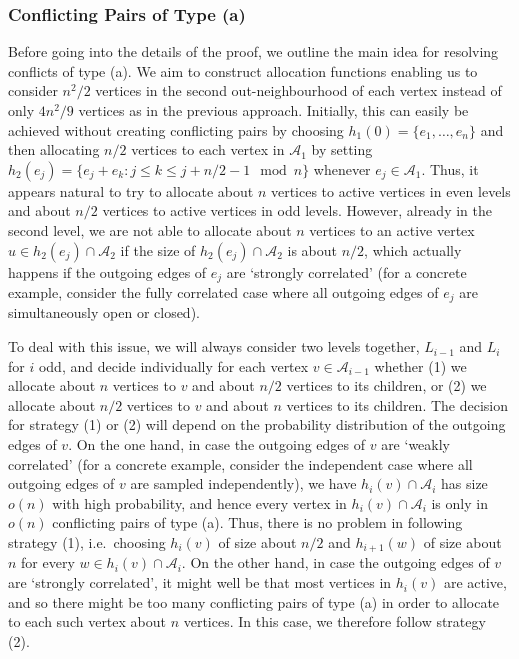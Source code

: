 \documentclass[11pt]{article}
\newcommand{\A}{\mathcal{A}}
\theoremstyle{remark}
\begin{document}
\subsubsection{Conflicting Pairs of Type (a)}

Before going into the details of the proof, we outline the main idea for resolving conflicts of type (a). We aim to construct allocation functions enabling us to consider $n^2/2$ vertices in the second out-neighbourhood of each vertex instead of only $4n^2/9$ vertices as in the previous approach. Initially, this can easily be achieved without creating conflicting pairs by choosing $h_1(0) = \{e_1,\ldots,e_n\}$ and then allocating $n/2$ vertices to each vertex in $\A_1$ by setting $h_2(e_j) = \{e_j + e_k : j \le k \le j+ n/2 -1 \mod n\}$ whenever $e_j \in \A_1$. Thus, it appears natural to try to allocate about $n$ vertices to active vertices in even levels and about $n/2$ vertices to active vertices in odd levels. However, already in the second level, we are not able to allocate about $n$ vertices to an active vertex $u \in h_2(e_j) \cap \A_2$ if the size of $h_2(e_j) \cap \A_2$ is about $n/2$, which actually happens if the outgoing edges of $e_j$ are `strongly correlated' (for a concrete example, consider the fully correlated case where all outgoing edges of $e_j$ are simultaneously open or closed). 

To deal with this issue, we will always consider two levels together, $L_{i-1}$ and $L_{i}$ for $i$ odd, and decide individually for each vertex $v \in \A_{i-1}$ whether (1) we allocate about $n$ vertices to $v$ and about $n/2$ vertices to its children, or (2) we allocate about $n/2$ vertices to $v$ and about $n$ vertices to its children. The decision for strategy (1) or (2) will depend on the probability distribution of the outgoing edges of $v$. On the one hand, in case the outgoing edges of $v$ are `weakly correlated' (for a concrete example, consider the independent case where all outgoing edges of $v$ are sampled independently), we have $h_{i}(v) \cap \A_{i}$ has size $o(n)$ with high probability, and hence every vertex in $h_{i}(v) \cap \A_{i}$ is only in $o(n)$ conflicting pairs of type (a). Thus, there is no problem in following strategy (1), i.e.\ choosing $h_{i}(v)$ of size about $n/2$ and $h_{i+1}(w)$ of size about $n$ for every $ w \in h_{i}(v) \cap \A_{i}$. On the other hand, in case the outgoing edges of $v$ are `strongly correlated', it might well be that most vertices in $h_{i}(v)$ are active, and so there might be too many conflicting pairs of type (a) in order to allocate to each such vertex about $n$ vertices. In this case, we therefore follow strategy (2). 
\end{document}
